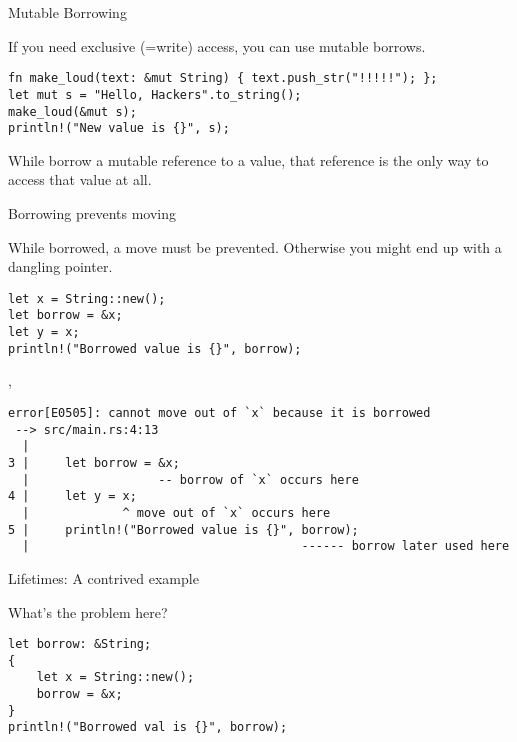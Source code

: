 
\begin{frame}[fragile]{Mutable Borrowing}

If you need exclusive (=write) access, you can use mutable borrows.

\begin{verbatim}
fn make_loud(text: &mut String) { text.push_str("!!!!!"); };
let mut s = "Hello, Hackers".to_string();
make_loud(&mut s);
println!("New value is {}", s);
\end{verbatim}

While borrow a mutable reference to a value, that reference is the only way to
access that value at all.
\end{frame}


\begin{frame}[fragile]{Borrowing prevents moving}

While borrowed, a move must be prevented. Otherwise you might end up with a
dangling pointer.

\begin{verbatim}
let x = String::new();
let borrow = &x;
let y = x;
println!("Borrowed value is {}", borrow);
\end{verbatim}

\sep

\begin{verbatim}
error[E0505]: cannot move out of `x` because it is borrowed
 --> src/main.rs:4:13
  |
3 |     let borrow = &x;
  |                  -- borrow of `x` occurs here
4 |     let y = x;
  |             ^ move out of `x` occurs here
5 |     println!("Borrowed value is {}", borrow);
  |                                      ------ borrow later used here
\end{verbatim}

\end{frame}


\begin{frame}[fragile]{Lifetimes: A contrived example}

What's the problem here?

\begin{verbatim}
let borrow: &String;
{
    let x = String::new();
    borrow = &x;
}
println!("Borrowed val is {}", borrow);
\end{verbatim}
\end{frame}


